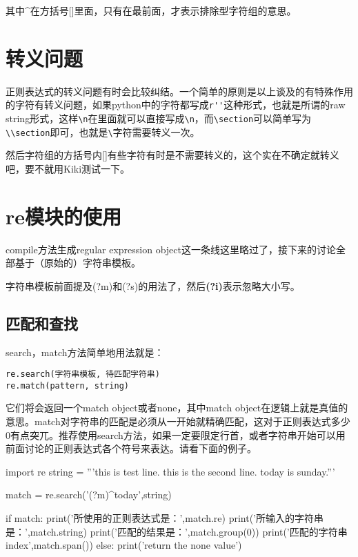 \documentclass[12pt,oneside]{book}
\begin{document}
\begin{common-format}
其中\^{}在方括号[]里面，只有在最前面，才表示排除型字符组的意思。


\section{转义问题}
正则表达式的转义问题有时会比较纠结。一个简单的原则是以上谈及的有特殊作用的字符有转义问题，如果python中的字符都写成\verb+r''+这种形式，也就是所谓的raw string形式，这样\verb+\n+在里面就可以直接写成\verb+\n+，而\verb+\section+可以简单写为\verb+\\section+即可，也就是\verb+\+字符需要转义一次。

然后字符组的方括号内[]有些字符有时是不需要转义的，这个实在不确定就转义吧，要不就用Kiki测试一下。


\section{re模块的使用}
compile方法生成regular expression object这一条线这里略过了，接下来的讨论全部基于（原始的）字符串模板。

字符串模板前面提及(?m)和(?s)的用法了，然后\textbf{(?i)}表示忽略大小写。

\subsection{匹配和查找}
search，match方法简单地用法就是：
\begin{Verbatim}
re.search(字符串模板, 待匹配字符串)
re.match(pattern, string)
\end{Verbatim}

它们将会返回一个match object或者none，其中match object在逻辑上就是真值的意思。match对字符串的匹配是必须从一开始就精确匹配，这对于正则表达式多少0有点突兀。推荐使用search方法，如果一定要限定行首，或者字符串开始可以用前面讨论的正则表达式各个符号来表达。请看下面的例子。

\begin{tcbpython}[]
import re
string = '''this is test line.
this is the second line.
today is sunday.'''

match = re.search('(?m)^today',string)

if match:
    print('所使用的正则表达式是：',match.re)
    print('所输入的字符串是：',match.string)
    print('匹配的结果是：',match.group(0))
    print('匹配的字符串index',match.span())
else:
    print('return the none value')
\end{tcbpython}


\end{common-format}
\end{document}
